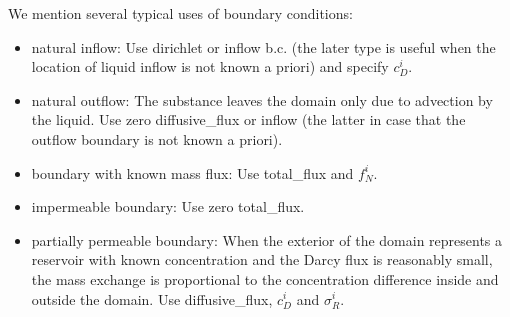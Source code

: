 We mention several typical uses of boundary conditions:
\begin{itemize}
\item natural inflow: Use dirichlet or inflow b.c. (the later type is useful when the location of liquid inflow is not known a priori) and specify $c_D^i$.
\item natural outflow: The substance leaves the domain only due to advection by the liquid. Use zero diffusive\_flux or inflow (the latter in case that the outflow boundary is not known a priori).
\item boundary with known mass flux: Use total\_flux and $f_N^i$.
\item impermeable boundary: Use zero total\_flux.
\item partially permeable boundary: When the exterior of the domain represents a reservoir with known concentration and the Darcy flux is reasonably small, the mass exchange is proportional to the concentration difference inside and outside the domain.
Use diffusive\_flux, $c_D^i$ and $\sigma_R^i$. 
\end{itemize}







